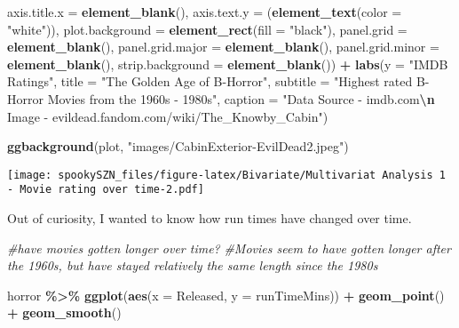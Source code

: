 \documentclass[
]{article}
\newenvironment{Shaded}{\begin{snugshade}}{\end{snugshade}}
\newcommand{\AttributeTok}[1]{\textcolor[rgb]{0.13,0.29,0.53}{#1}}
\newcommand{\CommentTok}[1]{\textcolor[rgb]{0.56,0.35,0.01}{\textit{#1}}}
\newcommand{\FunctionTok}[1]{\textcolor[rgb]{0.13,0.29,0.53}{\textbf{#1}}}
\newcommand{\NormalTok}[1]{#1}
\newcommand{\SpecialCharTok}[1]{\textcolor[rgb]{0.81,0.36,0.00}{\textbf{#1}}}
\newcommand{\StringTok}[1]{\textcolor[rgb]{0.31,0.60,0.02}{#1}}
\begin{document}
\begin{Shaded}
\begin{Highlighting}[]
    \AttributeTok{axis.title.x =} \FunctionTok{element\_blank}\NormalTok{(),}
    \AttributeTok{axis.text.y =}\NormalTok{ (}\FunctionTok{element\_text}\NormalTok{(}\AttributeTok{color =} \StringTok{"white"}\NormalTok{)),}
    \AttributeTok{plot.background =} \FunctionTok{element\_rect}\NormalTok{(}\AttributeTok{fill =} \StringTok{"black"}\NormalTok{), }
    \AttributeTok{panel.grid =} \FunctionTok{element\_blank}\NormalTok{(),}
    \AttributeTok{panel.grid.major =} \FunctionTok{element\_blank}\NormalTok{(),}
    \AttributeTok{panel.grid.minor =} \FunctionTok{element\_blank}\NormalTok{(),}
    \AttributeTok{strip.background =} \FunctionTok{element\_blank}\NormalTok{()) }\SpecialCharTok{+}
  \FunctionTok{labs}\NormalTok{(}\AttributeTok{y =} \StringTok{"IMDB Ratings"}\NormalTok{, }
       \AttributeTok{title =} \StringTok{"The Golden Age of B{-}Horror"}\NormalTok{, }
       \AttributeTok{subtitle =} \StringTok{"Highest rated B{-}Horror Movies from the 1960\textquotesingle{}s {-} 1980\textquotesingle{}s"}\NormalTok{,}
       \AttributeTok{caption =} \StringTok{"Data Source {-} imdb.com}\SpecialCharTok{\textbackslash{}n}\StringTok{ Image {-} evildead.fandom.com/wiki/The\_Knowby\_Cabin"}\NormalTok{) }

\FunctionTok{ggbackground}\NormalTok{(plot, }\StringTok{"images/CabinExterior{-}EvilDead2.jpeg"}\NormalTok{)}
\end{Highlighting}
\end{Shaded}

\texttt{[image: spookySZN\_files/figure-latex/Bivariate/Multivariat Analysis 1 - Movie rating over time-2.pdf]}

Out of curiosity, I wanted to know how run times have changed over time.

\begin{Shaded}
\begin{Highlighting}[]
\CommentTok{\#have movies gotten longer over time? }
\CommentTok{\#Movies seem to have gotten longer after the 1960\textquotesingle{}s, but have stayed relatively the same length since the 1980\textquotesingle{}s}


\NormalTok{horror }\SpecialCharTok{\%\textgreater{}\%} 
  \FunctionTok{ggplot}\NormalTok{(}\FunctionTok{aes}\NormalTok{(}\AttributeTok{x =}\NormalTok{ Released, }\AttributeTok{y =}\NormalTok{ runTimeMins)) }\SpecialCharTok{+}
  \FunctionTok{geom\_point}\NormalTok{() }\SpecialCharTok{+} 
  \FunctionTok{geom\_smooth}\NormalTok{()}
\end{Highlighting}
\end{Shaded}
\end{document}
